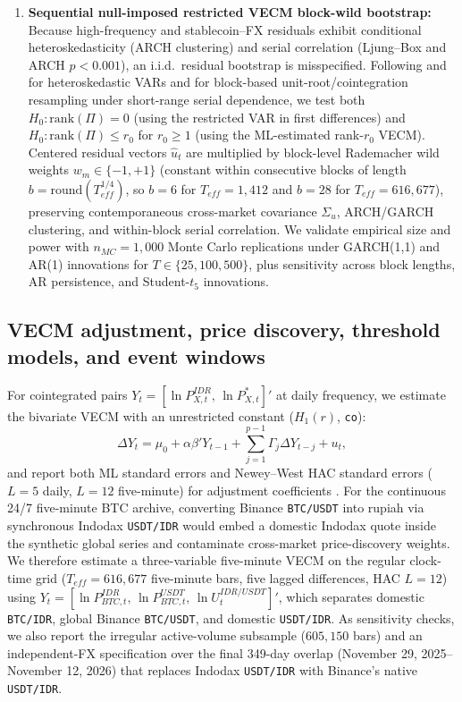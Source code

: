 \begin{enumerate}
  \item \textbf{Sequential null-imposed restricted VECM block-wild bootstrap:} Because high-frequency and stablecoin--FX residuals exhibit conditional heteroskedasticity (ARCH clustering) and serial correlation (Ljung--Box and ARCH $p < 0.001$), an i.i.d.\ residual bootstrap is misspecified. Following \citet{cavaliere2010testing} and \citet{cavaliere2012bootstrap} for heteroskedastic VARs and \citet{paparoditis2003residual} for block-based unit-root/cointegration resampling under short-range serial dependence, we test both $H_0: \mathrm{rank}(\Pi) = 0$ (using the restricted VAR in first differences) and $H_0: \mathrm{rank}(\Pi) \le r_0$ for $r_0 \ge 1$ (using the ML-estimated rank-$r_0$ VECM). Centered residual vectors $\hat{u}_t$ are multiplied by block-level Rademacher wild weights $w_m \in \{-1, +1\}$ (constant within consecutive blocks of length $b = \mathrm{round}(T_{eff}^{1/4})$, so $b = 6$ for $T_{eff} = 1,412$ and $b = 28$ for $T_{eff} = 616,677$), preserving contemporaneous cross-market covariance $\Sigma_u$, ARCH/GARCH clustering, and within-block serial correlation. We validate empirical size and power with $n_{MC} = 1,000$ Monte Carlo replications under GARCH(1,1) and AR(1) innovations for $T \in \{25, 100, 500\}$, plus sensitivity across block lengths, AR persistence, and Student-$t_5$ innovations.
\end{enumerate}

\subsection{VECM adjustment, price discovery, threshold models, and event windows}
For cointegrated pairs $Y_t = [\ln P_{X,t}^{IDR},\, \ln P_{X,t}^{*}]'$ at daily frequency, we estimate the bivariate VECM with an unrestricted constant ($H_1(r)$, \texttt{co}):
\begin{equation}
  \Delta Y_t = \mu_0 + \alpha \beta' Y_{t-1} + \sum_{j=1}^{p-1} \Gamma_j \Delta Y_{t-j} + u_t,
  \label{eq:vecm}
\end{equation}
and report both ML standard errors and Newey--West HAC standard errors ($L=5$ daily, $L=12$ five-minute) for adjustment coefficients \citep{newey1987simple}. For the continuous 24/7 five-minute BTC archive, converting Binance \texttt{BTC/USDT} into rupiah via synchronous Indodax \texttt{USDT/IDR} would embed a domestic Indodax quote inside the synthetic global series and contaminate cross-market price-discovery weights. We therefore estimate a three-variable five-minute VECM on the regular clock-time grid ($T_{eff} = 616,677$ five-minute bars, five lagged differences, HAC $L = 12$) using $Y_t = [\ln P_{BTC,t}^{IDR},\, \ln P_{BTC,t}^{USDT},\, \ln U_t^{IDR/USDT}]'$, which separates domestic \texttt{BTC/IDR}, global Binance \texttt{BTC/USDT}, and domestic \texttt{USDT/IDR}. As sensitivity checks, we also report the irregular active-volume subsample ($605,150$ bars) and an independent-FX specification over the final 349-day overlap (November 29, 2025--November 12, 2026) that replaces Indodax \texttt{USDT/IDR} with Binance's native \texttt{USDT/IDR}.

